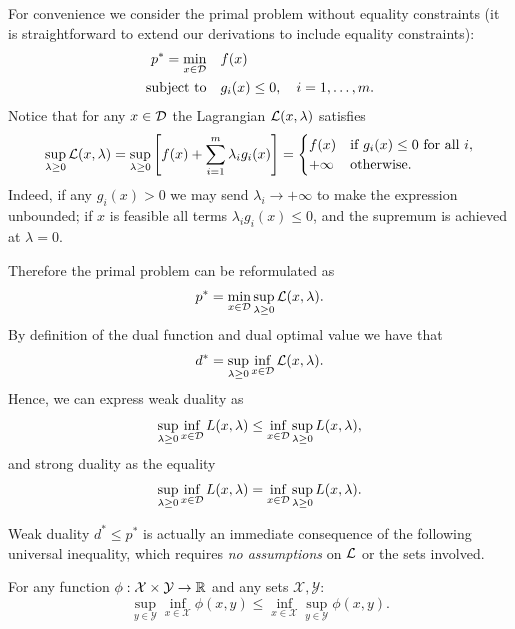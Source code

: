 For convenience we consider the primal problem without equality constraints (it is straightforward to extend our derivations to include equality constraints):
\begin{align}\label{eq:primalnoequality}
  p^* = \min_{x \in {\mathcal D}} \quad & f(x) \notag \\
  \text{subject to} \quad & g_i(x) \leq 0, \quad i = 1, \dots, m.
\end{align}
Notice that for any $x \in {\mathcal D}$ the Lagrangian $\mathcal{L}(x,\lambda)$ satisfies
$$
  \sup_{\lambda \geq 0} \mathcal{L}(x, \lambda)
  = \sup_{\lambda \geq 0} \left[ f(x) + \sum_{i=1}^{m} \lambda_i g_i(x) \right]
  =
  \begin{cases}
    f(x)   & \text{if } g_i(x) \leq 0 \text{ for all } i, \\
    +\infty & \text{otherwise.}
  \end{cases}
$$
Indeed, if any $g_i(x) > 0$ we may send $\lambda_i \to +\infty$ to make the expression
unbounded; if $x$ is feasible all terms $\lambda_i g_i(x) \leq 0$, and the supremum
is achieved at $\lambda = 0$.

Therefore the primal problem can be reformulated as
\begin{equation}\label{eq:primal_minmax}
 p^* = \min_{x \in {\mathcal D}} \sup_{\lambda \geq 0} \mathcal{L}(x, \lambda).
\end{equation}
By definition of the dual function and dual optimal value we have that
\begin{equation}\label{eq:dual_maxmin}
  d^* = \sup_{\lambda \geq 0} \inf_{x \in {\mathcal D}} \mathcal{L}(x, \lambda).
\end{equation}
Hence, we can express weak duality as
\begin{equation}\label{eq:weakminmax}   
\sup_{\lambda \geq 0} \inf_{x \in {\mathcal D}} L(x, \lambda)\le \inf_{x \in {\mathcal D}} \sup_{\lambda \geq 0}  L(x, \lambda),
\end{equation}
and strong duality as the equality
$$
\sup_{\lambda \geq 0} \inf_{x \in {\mathcal D}} L(x, \lambda) = \inf_{x \in {\mathcal D}} \sup_{\lambda \geq 0}  L(x, \lambda).
$$

Weak duality $d^* \leq p^*$ is actually an immediate consequence of the following universal
inequality, which requires \emph{no assumptions} on $\mathcal{L}$ or the sets involved.

\begin{theorem}
  For any function $\phi : {\mathcal X} \times {\mathcal Y} \to \mathbb{R}$ and any sets ${\mathcal X}, {\mathcal Y}$:
  $$
    \sup_{y \in {\mathcal Y}} \inf_{x \in {\mathcal X}} \phi(x, y)
    \leq
    \inf_{x \in {\mathcal X}} \sup_{y \in {\mathcal Y}} \phi(x, y).
  $$
\end{theorem}

